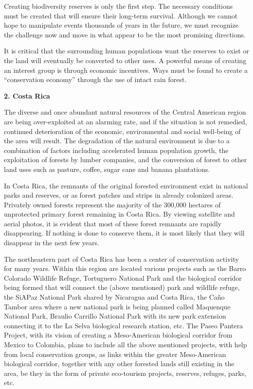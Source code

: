Creating biodiversity reserves is only the first step.  The necessary
conditions must be created that will ensure their long-term survival.
Although we cannot hope to manipulate events thousands of years in the
future, we must recognize the challenge now and move in what appear
to be the most promising directions.

It is critical that the surrounding human populations want the
reserves to exist or the land will eventually be converted to other
uses.  A powerful means of creating an interest group is through
economic incentives.  Ways must be found to create a ``conservation
economy'' through the use of intact rain forest.

\LP
{\large {\bf 2.  Costa Rica}}
\eLP

The diverse and once abundant natural resources of the Central
American region are being over-exploited at an alarming rate, and
if the situation is not remedied, continued deterioration of the
economic, environmental and social well-being of the area will
result.  The degradation of the natural environment is due to a
combination of factors including accelerated human population
growth, the exploitation of forests by lumber companies, and the
conversion of forest to other land uses such as pasture, coffee,
sugar cane and banana plantations.

In Costa Rica, the remnants of the original forested environment
exist in national parks and reserves, or as forest patches and
strips in already colonized areas.  Privately owned forests
represent the majority of the 300,000 hectares of unprotected
primary forest remaining in Costa Rica.  By viewing satellite and
aerial photos, it is evident that most of these forest remnants are
rapidly disappearing.  If nothing is done to conserve them, it is
most likely that they will disappear in the next few years.

The northeastern part of Costa Rica has been a center of
conservation activity for many years.  Within this region are
located various projects such as the Barro Colorado Wildlife
Refuge, Tortuguero National Park and the biological corridor being
formed that will connect the (above mentioned) park and wildlife refuge,
the SiAPaz National Park shared by Nicaragua and Costa Rica, the
Ca\~{n}o Tambor area where a new national park is being planned called
Maquenque National Park, Braulio Carrillo National Park with its new
park extension connecting it to the La Selva biological research
station, etc.  The Paseo Pantera Project, with its vision of
creating a Meso-American biological corridor from Mexico to
Colombia, plans to include all the above mentioned projects, with
help from local conservation groups, as links within the greater
Meso-American biological corridor, together with any other forested
lands still existing in the area, be they in the form of private
eco-tourism projects, reserves, refuges, parks, etc.

